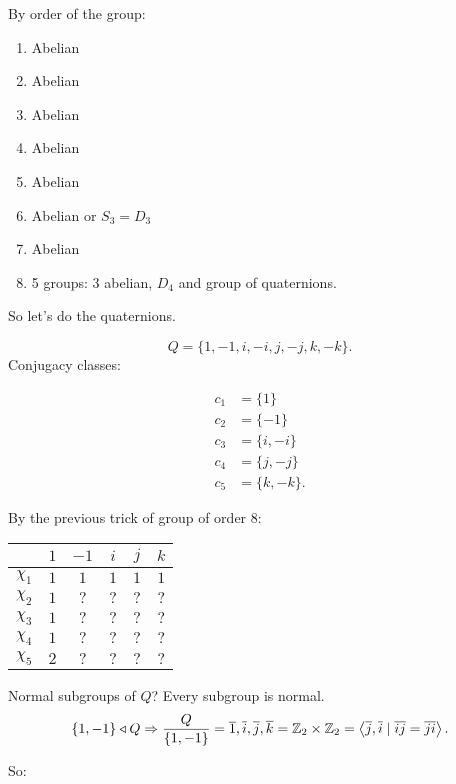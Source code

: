 \hr

By order of the group:

\begin{enumerate}
    \item Abelian
    \item Abelian
    \item Abelian
    \item Abelian
    \item Abelian
    \item Abelian or $ S_3 = D_3$
    \item Abelian
    \item 5 groups: 3 abelian, $ D_4$ and group of quaternions.
\end{enumerate}

So let's do the quaternions.

\[
Q = \{1, -1, i, -i, j, -j, k, -k\} 
.\] 
Conjugacy classes:

\begin{align*}
    c_1 &= \{1\} \\
    c_2 &= \{-1\} \\
    c_3 &= \{i, -i\} \\
    c_4 &= \{j, -j\} \\
    c_5 &= \{k, -k\} 
.\end{align*}

By the previous trick of group of order $8$:

\begin{center}\begin{tabular}{cccccc}
    & $1$ &  $-1$ &  $i$ &  $j$ &  $k$\\\hline
    $\chi_{1}$ & $1$ & $1$ & $1$& $1$& $1$\\
    $\chi_{2}$ & $1$ & $?$ & $?$& $?$& $?$\\
    $\chi_{3}$ & $1$ & $?$ & $?$& $?$& $?$\\
    $\chi_{4}$ & $1$ & $?$ & $?$& $?$& $?$\\
    $\chi_{5}$ & $2$ & $?$ & $?$& $?$& $?$\\
\end{tabular}\end{center}

Normal subgroups of $Q$? Every subgroup is normal.
 \[
     \{1, -1\}  \triangleleft Q \Rightarrow \frac{Q}{\{1, -1\} } = \overline{1}, \overline{i}, \overline{j}, \overline{k} = \mathbb{Z}_2 \times \mathbb{Z}_{2} = \left<\overline{j}, \overline{i}  \mid \overline{i} \overline{j} = \overline{j} \overline{i}\right>
.\] 

So:

